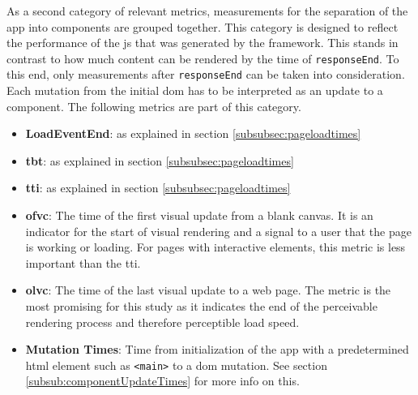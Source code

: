 \documentclass[a4paper, 12pt]{article}
\begin{document}
As a second category of relevant metrics, measurements for the separation of the app into components are grouped together.
This category is designed to reflect the performance of the \acrlong{js} that was generated by the framework.
This stands in contrast to how much content can be rendered by the time of \verb|responseEnd|.
To this end, only measurements after \verb|responseEnd| can be taken into consideration.
Each mutation from the initial \acrshort{dom} has to be interpreted as an update to a component.
The following metrics are part of this category.

\begin{itemize}
  \item \textbf{LoadEventEnd}: as explained in section \ref{subsubsec:pageloadtimes}
  \item \textbf{\acrfull{tbt}}: as explained in section \ref{subsubsec:pageloadtimes}
  \item \textbf{\acrfull{tti}}: as explained in section \ref{subsubsec:pageloadtimes}
  \item \textbf{\acrfull{ofvc}}: The time of the first visual update from a blank canvas.
  It is an indicator for the start of visual rendering and a signal to a user that the page is working or loading.
  For pages with interactive elements, this metric is less important than the \acrshort{tti}.
  \item \textbf{\acrfull{olvc}}: The time of the last visual update to a web page.
  The metric is the most promising for this study as it indicates the end of the perceivable rendering process and therefore perceptible load speed.
  \item \textbf{Mutation Times}: Time from initialization of the app with a predetermined \acrshort{html} element such as \verb|<main>| to a \acrshort{dom} mutation.
  See section \ref{subsub:componentUpdateTimes} for more info on this.
\end{itemize}
\end{document}
